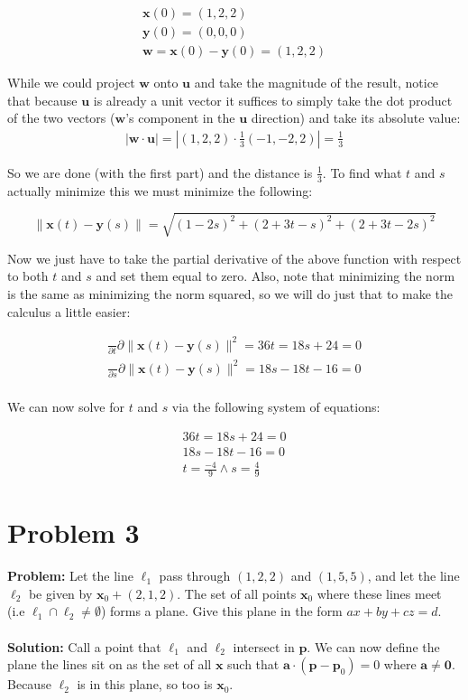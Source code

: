 \documentclass{article}
\begin{document}
\begin{gather*}
  \mathbf x(0)=(1,2,2)\\
  \mathbf y(0)=(0,0,0)\\
  \mathbf w=\mathbf x(0)-\mathbf y(0)=(1,2,2)
\end{gather*}

While we could project $\mathbf w$ onto $\mathbf u$ and take the magnitude of the result, notice that because $\mathbf u$ is already a unit vector it suffices to simply take the dot product of the two vectors ($\mathbf w$'s component in the $\mathbf u$ direction) and take its absolute value:
\begin{align*}
  |\mathbf w\cdot\mathbf u|=\left|(1,2,2)\cdot\frac{1}{3}(-1,-2,2)\right|=\frac{1}{3}
\end{align*}

So we are done (with the first part) and the distance is $\frac{1}{3}$. To find what $t$ and $s$ actually minimize this we must minimize the following:

$$\|\mathbf x(t)-\mathbf y(s)\|=\sqrt{(1-2s)^2+(2+3t-s)^2+(2+3t-2s)^2}$$

Now we just have to take the partial derivative of the above function with respect to both $t$ and $s$ and set them equal to zero. Also, note that minimizing the norm is the same as minimizing the norm squared, so we will do just that to make the calculus a little easier:

\begin{gather*}
  \frac{}{\partial t}\partial \|\mathbf x(t)-\mathbf y(s)\|^2=36t=18s+24=0\\
  \frac{}{\partial s}\partial \|\mathbf x(t)-\mathbf y(s)\|^2=18s-18t-16=0\\
\end{gather*}

We can now solve for $t$ and $s$ via the following system of equations:

\begin{gather*}
  36t=18s+24=0\\
  18s-18t-16=0\\
  t=\frac{-4}{9} \wedge s=\frac{4}{9}
\end{gather*}

\section{Problem 3}
\textbf{Problem:} Let the line $\ell_1$ pass through $(1,2,2)$ and $(1,5,5)$, and let the line $\ell_2$ be given by $\mathbf x_0+(2,1,2)$. The set of all points $\mathbf x_0$ where these lines meet (i.e $\ell_1\cap\ell_2\not=\emptyset$) forms a plane. Give this plane in the form $ax+by+cz=d$.
\\\\
\textbf{Solution:} Call a point that $\ell_1$ and $\ell_2$ intersect in $\mathbf p$. We can now define the plane the lines sit on as the set of all $\mathbf x$ such that $\mathbf a\cdot(\mathbf p-\mathbf p_0)=0$ where $\mathbf a\not=\mathbf 0$. Because $\ell_2$ is in this plane, so too is $\mathbf x_0$.
\end{document}
